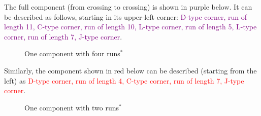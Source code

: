 \documentclass[openany]{book}
\newcommand{\gen}{\hyperref[generated]{$^*$}}%
\begin{document}
The full component (from crossing to crossing) is shown in purple below. It can be described as follows, starting in its upper-left corner: \textcolor{purple}{D-type corner, run of length 11, C-type corner, run of length 10, L-type corner, run of length 5, L-type corner, run of length 7, J-type corner}. 
\begin{figure}[H]\centering
{}
\caption{One component with four runs\gen}
\end{figure}

Similarly, the component shown in red below can be described (starting from the left) as \textcolor{red}{D-type corner, run of length 4, C-type corner, run of length 7, J-type corner}.
\begin{figure}[H]\centering
{}
\caption{One component with two runs\gen}
\end{figure}
\end{document}
